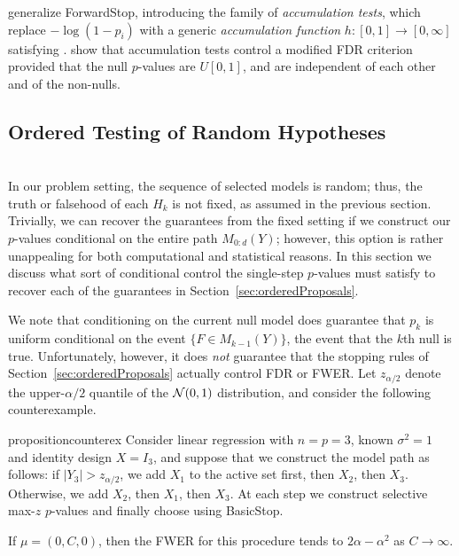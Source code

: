 \documentclass{article}
\begin{document}
\citet{li2015accumulation} generalize ForwardStop, introducing the family of {\em accumulation tests}, which replace $-\log(1-p_i)$ with a generic {\em accumulation function} $h: [0,1] \rightarrow [0,\infty]$ satisfying . \citet{li2015accumulation} show that accumulation tests control a modified FDR criterion provided that the null $p$-values are $U[0,1]$, and are independent of each other and of the non-nulls.


\subsection{Ordered Testing of Random Hypotheses}\label{sec:random-hyp}

 \\
In our problem setting, the sequence of selected models is random; thus, the truth or falsehood of each $H_k$ is not fixed, as assumed in the previous section. Trivially, we can recover the guarantees from the fixed setting if we construct our $p$-values conditional on the entire path $M_{0:d}(Y)$; however, this option is rather unappealing for both computational and statistical reasons. In this section we discuss what sort of conditional control the single-step $p$-values must satisfy to recover each of the guarantees in Section~\ref{sec:orderedProposals}.

We note that conditioning on the current null model does guarantee that $p_k$ is uniform conditional on the event $\{F\in M_{k-1}(Y)\}$, the event that the $k$th null is true. Unfortunately, however, it does {\em not} guarantee that the stopping rules of Section~\ref{sec:orderedProposals} actually control FDR or FWER. Let $z_{\alpha/2}$ denote the upper-$\alpha/2$ quantile of the $\mathcal{N}(0,1)$ distribution, and consider the following counterexample.

\begin{restatable}{proposition}{counterex}\label{prop:counterexample}
Consider linear regression with $n=p=3$, known $\sigma^2=1$ and identity design $X=I_3$, and suppose that we construct the model path as follows: if $|Y_3|>z_{\alpha/2}$, we add $X_1$ to the active set first, then $X_2$, then $X_3$. Otherwise, we add $X_2$, then $X_1$, then $X_3$. At each step we construct selective max-$z$ $p$-values and finally choose \smash{$\hk$} using BasicStop. 

If $\mu=(0,C,0)$, then the FWER for this procedure tends to $2\alpha-\alpha^2$ as $C\to\infty$.
\end{restatable}
\end{document}

